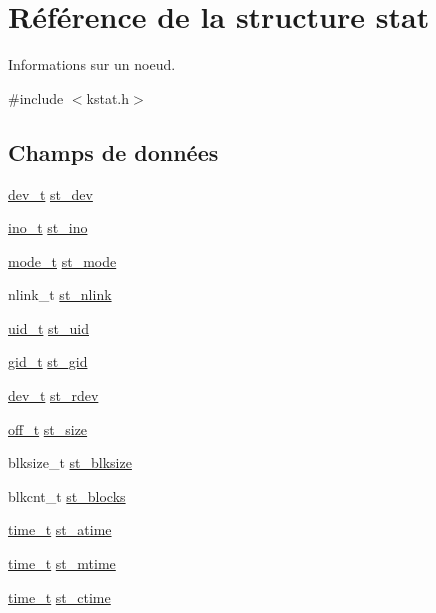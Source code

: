 \hypertarget{structstat}{\section{Référence de la structure stat}
\label{structstat}
}


Informations sur un noeud.  




{\ttfamily \#include $<$kstat.\+h$>$}

\subsection*{Champs de données}
\begin{DoxyCompactItemize}
\item 
\hyperlink{kstat_8h_a451f1b5788fa7cc5d33db47a5992e7a6}{dev\+\_\+t} \hyperlink{structstat_ac5b90090ae323741ae4c9e4f3683a29f}{st\+\_\+dev}
\item 
\hyperlink{kstat_8h_aed4e918b44240739869c4bdb1c4787a9}{ino\+\_\+t} \hyperlink{structstat_a9769ed8f0d4c5a9f329c32bc92479d56}{st\+\_\+ino}
\item 
\hyperlink{kstat_8h_af8f4385bb42836d1e3ad4fea9d71d1b9}{mode\+\_\+t} \hyperlink{structstat_a5cbdd829011af82ba61e83773bbcbc7d}{st\+\_\+mode}
\item 
nlink\+\_\+t \hyperlink{structstat_a0ed9092fa6c77a3251b9b9a4738ef84f}{st\+\_\+nlink}
\item 
\hyperlink{kstat_8h_af2306308627701b66dc6f3babe821ab4}{uid\+\_\+t} \hyperlink{structstat_a4a8708a3d18be60ee7b2f06c4cab0c70}{st\+\_\+uid}
\item 
\hyperlink{kstat_8h_aa7352f1065fe606194d792e2b292cf83}{gid\+\_\+t} \hyperlink{structstat_ab864f16f436cec370f0ced585d897698}{st\+\_\+gid}
\item 
\hyperlink{kstat_8h_a451f1b5788fa7cc5d33db47a5992e7a6}{dev\+\_\+t} \hyperlink{structstat_aa61e6c1a8a91c69f1d26f6700a0546cb}{st\+\_\+rdev}
\item 
\hyperlink{libc_2include_2sys_2types_8h_a447a6a64dbb8fb44b1e62856b333db4a}{off\+\_\+t} \hyperlink{structstat_a040e19c8b9766f841fde8786ce9297bf}{st\+\_\+size}
\item 
blksize\+\_\+t \hyperlink{structstat_a38d474e1ae3cf6fbdde89ac3c3e308f1}{st\+\_\+blksize}
\item 
blkcnt\+\_\+t \hyperlink{structstat_a42dd716b2f9234f961d949fc9500eefb}{st\+\_\+blocks}
\item 
\hyperlink{time_8h_aaaf414ca0598a3633e6e9161cbb5a58a}{time\+\_\+t} \hyperlink{structstat_ab74d1e7e345e88b9d0fb2688a97cba64}{st\+\_\+atime}
\item 
\hyperlink{time_8h_aaaf414ca0598a3633e6e9161cbb5a58a}{time\+\_\+t} \hyperlink{structstat_a77e235090f8cb6897f1c0ce65689006b}{st\+\_\+mtime}
\item 
\hyperlink{time_8h_aaaf414ca0598a3633e6e9161cbb5a58a}{time\+\_\+t} \hyperlink{structstat_a1b4b858db1ebe79c3d6e0fc1ef721024}{st\+\_\+ctime}
\end{DoxyCompactItemize}


